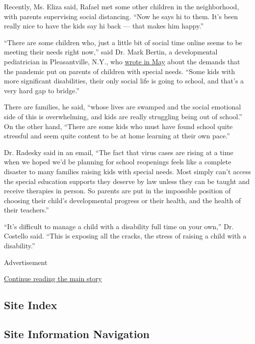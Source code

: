 Recently, Ms. Eliza said, Rafael met some other children in the
neighborhood, with parents supervising social distancing. ``Now he says
hi to them. It's been really nice to have the kids say hi back --- that
makes him happy.''

``There are some children who, just a little bit of social time online
seems to be meeting their needs right now,'' said Dr. Mark Bertin, a
developmental pediatrician in Pleasantville, N.Y., who
\href{https://www.nytimes.com/2020/05/13/well/family/coronavirus-shutdowns-children-special-needs-adhd-autism.html?searchResultPosition=1}{wrote
in May} about the demands that the pandemic put on parents of children
with special needs. ``Some kids with more significant disabilities,
their only social life is going to school, and that's a very hard gap to
bridge.''

There are families, he said, ``whose lives are swamped and the social
emotional side of this is overwhelming, and kids are really struggling
being out of school.'' On the other hand, ``There are some kids who must
have found school quite stressful and seem quite content to be at home
learning at their own pace.''

Dr. Radesky said in an email, ``The fact that virus cases are rising at
a time when we hoped we'd be planning for school reopenings feels like a
complete disaster to many families raising kids with special needs. Most
simply can't access the special education supports they deserve by law
unless they can be taught and receive therapies in person. So parents
are put in the impossible position of choosing their child's
developmental progress or their health, and the health of their
teachers.''

``It's difficult to manage a child with a disability full time on your
own,'' Dr. Costello said. ``This is exposing all the cracks, the stress
of raising a child with a disability.''

Advertisement

\protect\hyperlink{after-bottom}{Continue reading the main story}

\hypertarget{site-index}{%
\subsection{Site Index}\label{site-index}}

\hypertarget{site-information-navigation}{%
\subsection{Site Information
Navigation}\label{site-information-navigation}}

